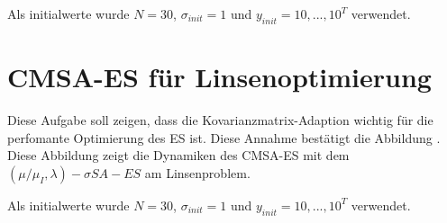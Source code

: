 Als initialwerte wurde $N=30$, $\sigma_{init}=1$ und $y_{init}={10,...,10}^T$ verwendet.


\chapter{CMSA-ES für Linsenoptimierung}

Diese Aufgabe soll zeigen, dass die Kovarianzmatrix-Adaption wichtig für die perfomante Optimierung des ES ist. Diese Annahme bestätigt die Abbildung . Diese Abbildung zeigt die Dynamiken des CMSA-ES mit dem $(\mu/\mu_I,\lambda)-\sigma SA-ES$ am Linsenproblem.

Als initialwerte wurde $N=30$, $\sigma_{init}=1$ und $y_{init}={10,...,10}^T$ verwendet.







